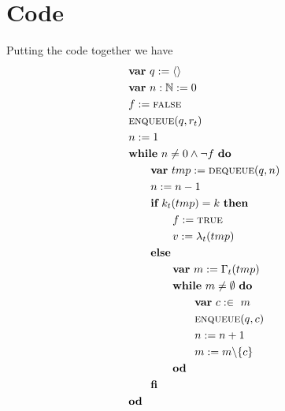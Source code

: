 \documentclass[headings=small,a4paper,12pt]{scrartcl}
\newcommand{\enq}{\textsc{enqueue}\xspace}
\newcommand{\deq}{\textsc{dequeue}\xspace}
\begin{document}
\section{Code}
\label{sec:code}
Putting the code together we have
\begin{align}
    &\VAR~q\Ass\langle\rangle\\
    &\VAR~n:\mathbb{N}\Ass 0\\
    &f\Ass \False\\
    &\enq(q,r_t)\\
    &n\Ass 1\\
    &\WHILE~n \ne 0\And \Not f~\DO\\
    &\qquad \VAR~tmp\Ass \deq(q,n)\\
    &\qquad n\Ass n-1\\
    &\qquad \IF~k_t(tmp) = k~\THEN\\
    &\qquad\qquad f\Ass \True\\
    &\qquad\qquad v\Ass \lambda_t(tmp)\\
    &\qquad \ELSE\\
    &\qquad\qquad \VAR~m\Ass \Gamma_t(tmp)\\
    &\qquad\qquad\WHILE~m \ne \emptyset~\DO\\
    &\qquad\qquad\qquad\VAR~c:\in~m\\
    &\qquad\qquad\qquad\enq(q,c)\\
    &\qquad\qquad\qquad n \Ass n+1\\
    &\qquad\qquad\qquad m\Ass m\backslash\{c\}\\
    &\qquad\qquad\OD\\
    &\qquad\FI\\
    &\OD
\end{align}
\end{document}
